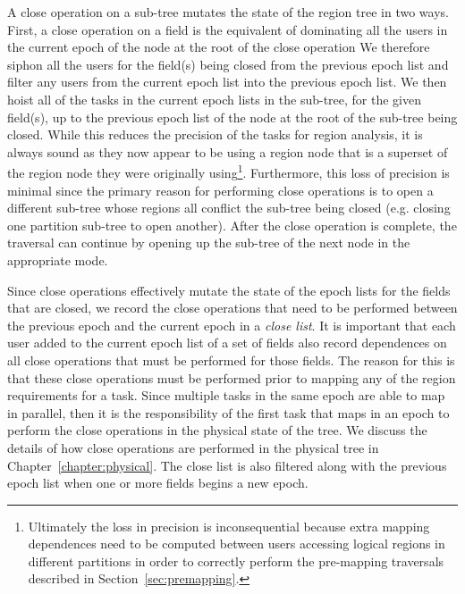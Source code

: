 A close operation on a sub-tree mutates the state 
of the region tree in two ways.  First, a close
operation on a field is the equivalent of dominating
all the users in the current epoch of the node at
the root of the close operation
We therefore siphon all the users for the
field(s) being closed from the previous epoch list
and filter any users from the current epoch list
into the previous epoch list.  We then hoist all
of the tasks in the current epoch lists in the
sub-tree, for the given field(s), up to the previous
epoch list of the node at the root of the sub-tree
being closed. While this reduces the precision of
the tasks for region analysis, it is always sound
as they now appear to be using a region node that 
is a superset of the region node they were
originally using\footnote{Ultimately the loss in 
precision is inconsequential because extra mapping 
dependences need to be computed between users accessing
logical regions in different partitions in order to
correctly perform the pre-mapping traversals described
in Section~\ref{sec:premapping}.}.  Furthermore, this 
loss of precision is minimal since the primary reason
for performing close operations is to open a
different sub-tree whose regions all conflict
the sub-tree being closed (e.g. closing one
partition sub-tree to open another). After the
close operation is complete, the traversal
can continue by opening up the sub-tree of 
the next node in the appropriate mode.

Since close operations effectively mutate the
state of the epoch lists for the fields that
are closed, we record the close operations that
need to be performed between the previous
epoch and the current epoch in a {\em close
list}. It is important that each user added to
the current epoch list of a set of fields also
record dependences on all close operations that
must be performed for those fields. The reason
for this is that these close operations must
be performed prior to mapping any of the region
requirements for a task.
Since multiple tasks in the same epoch are
able to map in parallel, then it is the 
responsibility of the first task that maps
in an epoch to perform the close operations in 
the physical state of the tree. We discuss the 
details of how close operations are performed in the 
physical tree in Chapter~\ref{chapter:physical}.
The close list is also filtered along with the
previous epoch list when one or more fields begins
a new epoch.

